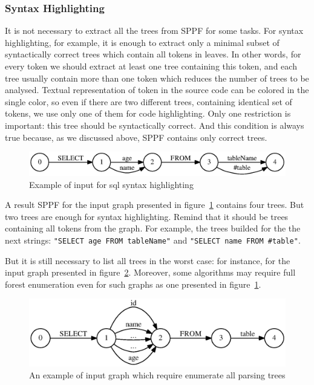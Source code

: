 \documentclass{acm_proc_article-sp}
\begin{document}
\subsubsection{Syntax Highlighting}

It is not necessary to extract all the trees from SPPF for some tasks. For syntax highlighting, for example, it is enough to extract only a minimal subset of syntactically correct trees which contain all tokens in leaves. In other words, for every token we should extract at least one tree containing this token, and each tree usually contain more than one token which reduces the number of trees to be analysed. Textual representation of token in the source code can be colored in the single color, so even if there are two different trees, containing identical set of tokens, we use only one of them for code highlighting. Only one restriction is important: this tree should be syntactically correct. And this condition is always true because, as we discussed above, SPPF contains only correct trees.

\begin{figure}[h!]
    \begin{center}
        \includegraphics[scale=0.4]{graphs/sql_input_static_idea.eps}
    \end{center}
    \caption{Example of input for sql syntax highlighting}
    \label{sql_hl}
\end{figure}

A result SPPF for the input graph presented in figure~\ref{sql_hl} contains four trees. But two trees are enough for syntax highlighting. Remind that it should be trees containing all tokens from the graph. For example, the trees builded for the the next strings:  \verb|"SELECT age FROM tableName"| and \verb|"SELECT name FROM #table"|.

But it is still necessary to list all trees in the worst case: for instance, for the input graph presented in figure~\ref{bad_case}. Moreover, some algorithms may require full forest enumeration even for such graphs as one presented in figure~\ref{sql_hl}. 

\begin{figure}[h!]
    \begin{center}
        \includegraphics[scale=0.4]{graphs/Bad_case.eps}
    \end{center}
    \caption{An example of input graph which require enumerate all parsing trees}
    \label{bad_case}
\end{figure}
\end{document}
